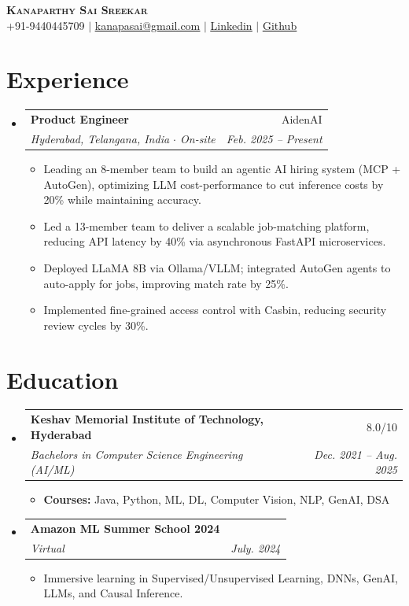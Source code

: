 \documentclass[letterpaper,11pt]{article}
\makeatletter
\newcommand{\resumeItem}[1]{
  \item\small{
    {#1}
  }
}
\newcommand{\resumeSubheading}[4]{
  \vspace{-2pt}\item
    \begin{tabular*}{0.97\textwidth}[t]{l@{\extracolsep{\fill}}r}
      \textbf{#1} & #2 \\
      \textit{\small#3} & \textit{\small #4} \\
    \end{tabular*}\vspace{-7pt}
}
\newcommand{\resumeSubHeadingListStart}{\begin{itemize}[leftmargin=0.15in, label={}]}
\newcommand{\resumeSubHeadingListEnd}{\end{itemize}}
\newcommand{\resumeItemListStart}{\begin{itemize}[itemsep=0pt, parsep=0pt]}
\newcommand{\resumeItemListEnd}{\end{itemize}\vspace{-5pt}}
\makeatother
\begin{document}
\begin{center}
    \textbf{\Huge \scshape \textcolor{blue(pigment)}{Kanaparthy Sai Sreekar}} \\ \vspace{5pt}
    \small +91-9440445709 $|$ \href{mailto:kanapasai@gmail.com}{\underline{kanapasai@gmail.com}} $|$ 
    \href{https://www.linkedin.com/in/saisreekarkanaparthy/}{\underline{Linkedin}} $|$
    \href{https://github.com/KanaparthySaiSreekar}{\underline{Github}}
\end{center}

\section{\textcolor{blue(pigment)}{Experience}}
  \resumeSubHeadingListStart
    \resumeSubheading
      {Product Engineer}{AidenAI}
      {Hyderabad, Telangana, India $\cdot$ On-site}{Feb. 2025 -- Present}
      \resumeItemListStart
        \resumeItem{Leading an 8-member team to build an agentic AI hiring system (MCP + AutoGen), optimizing LLM cost-performance to cut inference costs by 20\% while maintaining accuracy.}
        \resumeItem{Led a 13-member team to deliver a scalable job-matching platform, reducing API latency by 40\% via asynchronous FastAPI microservices.}
        \resumeItem{Deployed LLaMA 8B via Ollama/VLLM; integrated AutoGen agents to auto-apply for jobs, improving match rate by 25\%.}
        \resumeItem{Implemented fine-grained access control with Casbin, reducing security review cycles by 30\%.}
      \resumeItemListEnd
  \resumeSubHeadingListEnd

\section{\textcolor{blue(pigment)}{Education}}
  \resumeSubHeadingListStart
    \resumeSubheading
      {Keshav Memorial Institute of Technology, Hyderabad}{8.0/10}
      {Bachelors in Computer Science Engineering (AI/ML)}{Dec. 2021 -- Aug. 2025}
      \resumeItemListStart
        \resumeItem{\textbf{Courses:} Java, Python, ML, DL, Computer Vision, NLP, GenAI, DSA}
      \resumeItemListEnd
    \resumeSubheading
      {Amazon ML Summer School 2024}{}
      {Virtual}{July. 2024}
      \resumeItemListStart
       \resumeItem{Immersive learning in Supervised/Unsupervised Learning, DNNs, GenAI, LLMs, and Causal Inference.}
      \resumeItemListEnd
  \resumeSubHeadingListEnd
\end{document}
